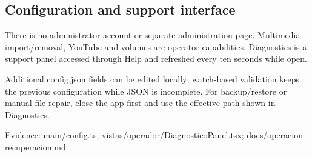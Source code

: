 \subsection{Configuration and support interface}

There is no administrator account or separate administration page. Multimedia import/removal, YouTube and volumes are operator capabilities. Diagnostics is a support panel accessed through Help and refreshed every ten seconds while open.

Additional config.json fields can be edited locally; watch-based validation keeps the previous configuration while JSON is incomplete. For backup/restore or manual file repair, close the app first and use the effective path shown in Diagnostics.

Evidence: main/config.ts; vistas/operador/DiagnosticoPanel.tsx; docs/operacion-recuperacion.md
